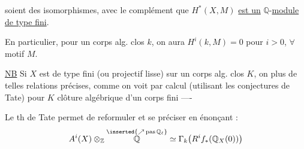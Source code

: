 soient des isomorphismes, avec %
le complément que $H^*(X,M)$ \uline{est un} %
$\mathbb{Q}$-\uline{module de type fini}.  %

En particulier, pour un corps alg. clos $k$, on %
aura $H^i(k,M)=0$ pour $i>0$, $\forall$ motif $M$. %

\uline{NB} Si $X$ est de type fini (ou projectif lisse) %
sur un corps alg. clos $K$, on  plus de %
telles relations précises, comme on voit %
par calcul  (utilisant les conjectures %
de Tate) pour $K$ clôture algébrique %
d'un corps fini ---- %

Le th de Tate permet de reformuler et %
se préciser en énonçant : %
\[
 A^i(X)\otimes_{\mathbb{Z}}\overset{\inserted{\nearrow\,\text{pas}\,\mathbb{Q}_{\ell}}}{\mathbb{Q}}
 \simeq\Gamma_k\bigl(R^i f_*(\mathbb{Q}_X(0))\bigr) %
\]
